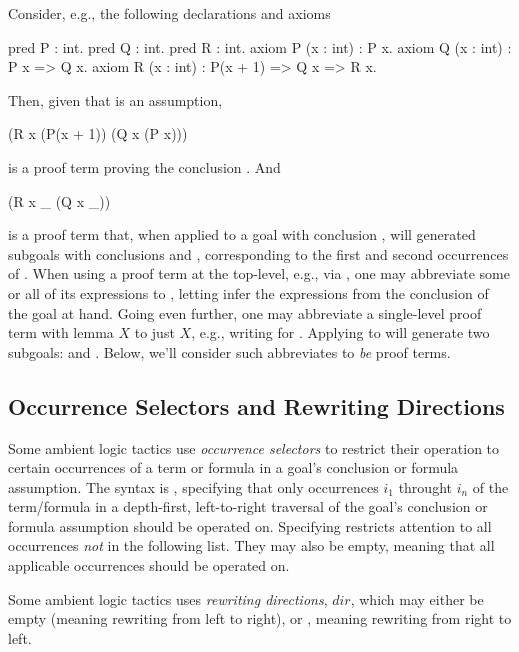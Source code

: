 Consider, e.g., the following declarations and axioms
\begin{easycrypt}{}{}
pred P : int.
pred Q : int.
pred R : int.
axiom P (x : int) : P x.
axiom Q (x : int) : P x => Q x.
axiom R (x : int) : P(x + 1) => Q x => R x.
\end{easycrypt}
Then, given that  is an assumption,
\begin{easycrypt}{}{}
(R x (P(x + 1)) (Q x (P x)))
\end{easycrypt}
is a proof term proving the conclusion . And
\begin{easycrypt}{}{}
(R x _ (Q x _))
\end{easycrypt}
is a proof term that, when applied to a goal with conclusion ,
will generated subgoals with conclusions  and ,
corresponding to the first and second occurrences of \ec{_}.  When
using a proof term at the top-level, e.g., via , one may
abbreviate some or all of its expressions to \ec{_}, letting
\EasyCrypt infer the expressions from the conclusion of the goal at
hand. Going even further, one may abbreviate a single-level proof term
with lemma $X$ to just $X$, e.g., writing  for .
Applying  to  will generate two subgoals: 
and . Below, we'll consider such abbreviates to \emph{be} proof
terms.

\subsection{Occurrence Selectors and Rewriting Directions}
\label{subsec:occsels}

Some ambient logic tactics use \emph{occurrence selectors} to restrict
their operation to certain occurrences of a term or formula in a
goal's conclusion or formula assumption. The syntax is , specifying that only occurrences $i_1$
throught $i_n$ of the term/formula in a depth-first, left-to-right
traversal of the goal's conclusion or formula assumption should be
operated on. Specifying 
restricts attention to all occurrences \emph{not} in the following
list. They may also be empty, meaning that all applicable occurrences
should be operated on.

Some ambient logic tactics uses \emph{rewriting directions}, $\mathit{dir}$,
which may either be empty (meaning rewriting from left to right), or \ec{-},
meaning rewriting from right to left.

